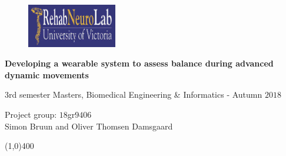 \clearpage
\thispagestyle{empty}

\begin{figure}[H]
	\hspace{4.5cm}
	\raggedright{
	\includegraphics[width=0.35\textwidth]{setup/RNL.png} }
\end{figure} 

\vspace{3 cm}

\begin{center}
	\begin{Huge}
		\textbf{Developing a wearable system to assess balance during advanced dynamic movements}\\ 
	\end{Huge}
		\vspace{20 mm}
		\begin{Huge}
		3rd semester Masters, Biomedical Engineering \& Informatics - Autumn $2018$\\
		\vspace{3 mm}
	\end{Huge}
	{\Large Project group: $18$gr$9406$} \\
	\vspace{1cm}
	\large{Simon Bruun and Oliver Thomsen Damsgaard}
\end{center}
\vspace*{\fill}

\begin{center}
	\line(1,0){400}
\end{center}

